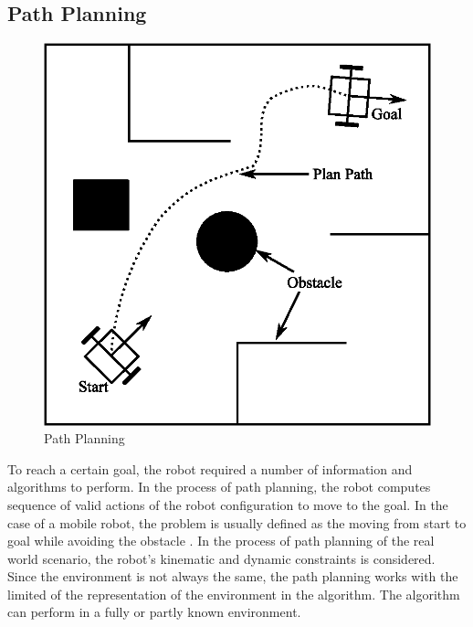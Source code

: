 \subsection{Path Planning}

\begin{figure}[ht]
	\centering
	\includegraphics[scale=1]{images/imagess/2lit-pathplan.eps} 
	\caption{Path Planning}
	\label{fig:Path Planning}
\end{figure}

\hspace{1.27cm}
To reach a certain goal, the robot required a number of information and algorithms to perform. In the process of path planning, the robot computes sequence of valid actions of the robot configuration to move to the goal. In the case of a mobile robot, the problem is usually defined as the moving from start to goal while avoiding the obstacle \textbf{\figureautorefname{ \ref{fig:Path Planning}}}. In the process of path planning of the real world scenario, the robot’s kinematic and dynamic constraints is considered. Since the environment is not always the same, the path planning works with the limited of the representation of the environment in the algorithm. The algorithm can perform in a fully or partly known environment.\par

